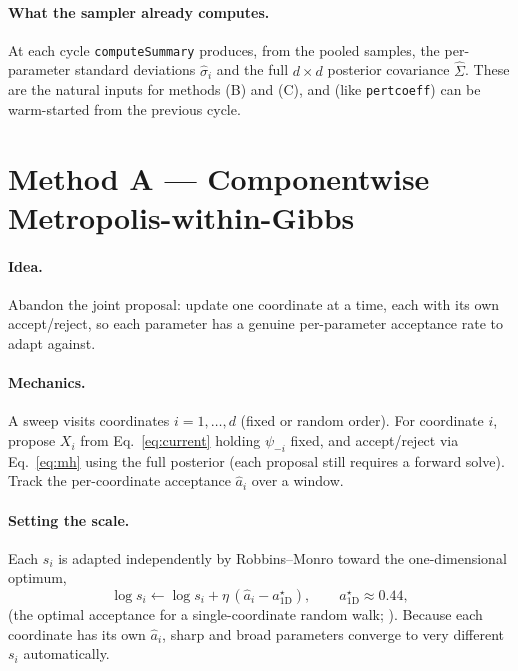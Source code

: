 \documentclass[11pt]{article}
\newcommand{\code}[1]{\texttt{\small #1}}
\newcommand{\pc}{\code{pertcoeff}}
\begin{document}
\paragraph{What the sampler already computes.} At each cycle
\code{computeSummary} produces, from the pooled samples, the
per-parameter standard deviations $\hat\sigma_i$ and the full
$d\times d$ posterior covariance $\hat\Sigma$. These are the natural
inputs for methods (B) and (C), and (like \pc) can be warm-started from
the previous cycle.

\section{Method A --- Componentwise Metropolis-within-Gibbs}

\paragraph{Idea.} Abandon the joint proposal: update one coordinate at a
time, each with its own accept/reject, so each parameter has a genuine
per-parameter acceptance rate to adapt against.

\paragraph{Mechanics.} A sweep visits coordinates $i=1,\dots,d$ (fixed or
random order). For coordinate $i$, propose $X_i$ from
Eq.~\eqref{eq:current} holding $\psi_{-i}$ fixed, and accept/reject via
Eq.~\eqref{eq:mh} using the full posterior (each proposal still requires a
forward solve). Track the per-coordinate acceptance $\hat a_i$ over a
window.

\paragraph{Setting the scale.} Each $s_i$ is adapted independently by
Robbins--Monro toward the one-dimensional optimum,
\begin{equation}
  \log s_i \leftarrow \log s_i + \eta\,(\hat a_i - a^\star_{1\mathrm D}),
  \qquad a^\star_{1\mathrm D}\approx 0.44,
\end{equation}
(the optimal acceptance for a single-coordinate random walk;
\cite{gelman1996}). Because each coordinate has its own $\hat a_i$, sharp
and broad parameters converge to very different $s_i$ automatically.
\end{document}
